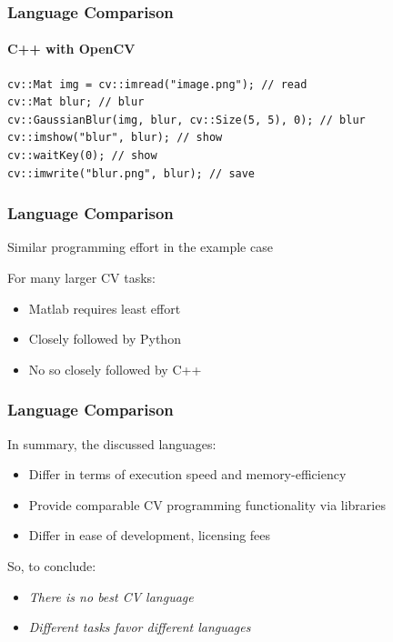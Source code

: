 \documentclass[xetex,professionalfont]{beamer}
\begin{document}

\begin{frame}[fragile]
\frametitle{Language Comparison}
\framesubtitle{C++ with OpenCV}

\begin{verbatim}
cv::Mat img = cv::imread("image.png"); // read
cv::Mat blur; // blur
cv::GaussianBlur(img, blur, cv::Size(5, 5), 0); // blur
cv::imshow("blur", blur); // show
cv::waitKey(0); // show
cv::imwrite("blur.png", blur); // save
\end{verbatim}

\end{frame}


\begin{frame}
\frametitle{Language Comparison}

Similar programming effort in the example case

\bigskip
For many larger CV tasks:
\begin{itemize}
	\item Matlab requires least effort
	\item Closely followed by Python
	\item No so closely followed by C++
\end{itemize}

\end{frame}


\begin{frame}
\frametitle{Language Comparison}

In summary, the discussed languages:
\begin{itemize}
	\item Differ in terms of execution speed and memory-efficiency
	\item Provide comparable CV programming functionality via libraries
	\item Differ in ease of development, licensing fees
\end{itemize}

\bigskip
So, to conclude:
\begin{itemize}
	\item \emph{There is no best CV language}
	\item \emph{Different tasks favor different languages}
\end{itemize}

\end{frame}
\end{document}
